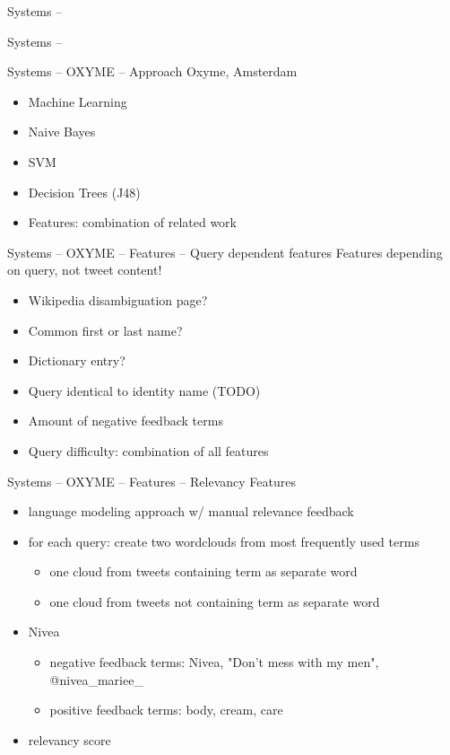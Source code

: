 \documentclass[12pt,a4paper]{beamer}
\begin{document}
\begin{frame}{Systems -- }

\end{frame}


\begin{frame}{Systems -- }

\end{frame}



\begin{frame}{Systems -- OXYME -- Approach}
Oxyme, Amsterdam \cite{oxyme}
\begin{itemize}
\item Machine Learning
\item Naive Bayes
\item SVM
\item Decision Trees (J48)
\item Features: combination of related work
\end{itemize}

\end{frame}

\begin{frame}{Systems -- OXYME -- Features -- Query dependent features}
Features depending on query, not tweet content!
\begin{itemize}
\item Wikipedia disambiguation page?
\item Common first or last name?
\item Dictionary entry?
\item Query identical to identity name (TODO)
\item Amount of negative feedback terms
\item Query difficulty: combination of all features
\end{itemize}

\end{frame}


\begin{frame}{Systems -- OXYME -- Features -- Relevancy Features}
\begin{itemize}
\item language modeling approach w/ manual relevance feedback
\item for each query: create two wordclouds from most frequently used terms
  \begin{itemize}
  \item one cloud from tweets containing term as separate word
  \item one cloud from tweets not containing term as separate word
  \end{itemize}
\item Nivea
  \begin{itemize}
  \item negative feedback terms: Nivea, "Don't mess with my men", @nivea\_mariee\_
  \item positive feedback terms: body, cream, care
  \end{itemize}
\item relevancy score
\end{itemize}

\end{frame}
\end{document}
